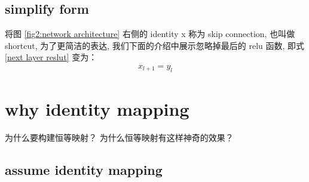 \documentclass[12pt]{ctexart}%
\begin{document}
			\subsection{\quad simplify form}
					 将图 \ref{fig2:network architecture} 右侧的 identity x 称为 skip connection, 也叫做 shortcut, 为了更简洁的表达, 我们下面的介绍中展示忽略掉最后的 relu 函数, 即式 \ref{next layer reslut} 变为：
							\begin{align}
								x_{l+1} = y_l
							\end{align}
		
	\section{\quad why identity mapping}
		为什么要构建恒等映射？ 为什么恒等映射有这样神奇的效果？
		\subsection{\quad assume identity mapping}
\end{document}
